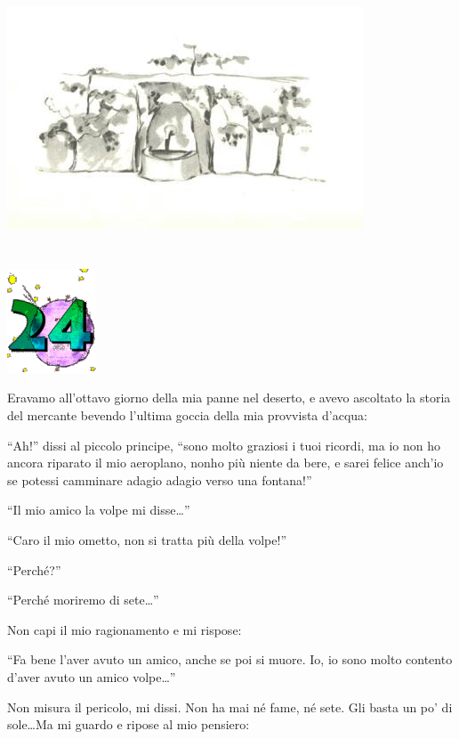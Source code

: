 \documentclass[11pt]{scrbook}
\begin{document}
\begin{center}
\includegraphics{img/studanka}
\end{center}

\chapter{}
\begin{center}
\includegraphics{img/chapter24}
\end{center}

Eravamo all'ottavo giorno della mia panne nel deserto, e avevo ascoltato
la storia del mercante bevendo l'ultima goccia della mia provvista
d'acqua:

``Ah!'' dissi al piccolo principe, ``sono molto graziosi i tuoi ricordi,
ma io non ho ancora riparato il mio aeroplano, nonho più niente da bere,
e sarei felice anch'io se potessi camminare adagio adagio verso una
fontana!''

``Il mio amico la volpe mi disse\ldots{}''

``Caro il mio ometto, non si tratta più della volpe!''

``Perché?''

``Perché moriremo di sete\ldots{}''

Non capi il mio ragionamento e mi rispose:

``Fa bene l'aver avuto un amico, anche se poi si muore. Io, io sono
molto contento d'aver avuto un amico volpe\ldots{}''

Non misura il pericolo, mi dissi. Non ha mai né fame, né sete. Gli basta
un po' di sole\ldots{}Ma mi guardo e ripose al mio pensiero:
\end{document}
